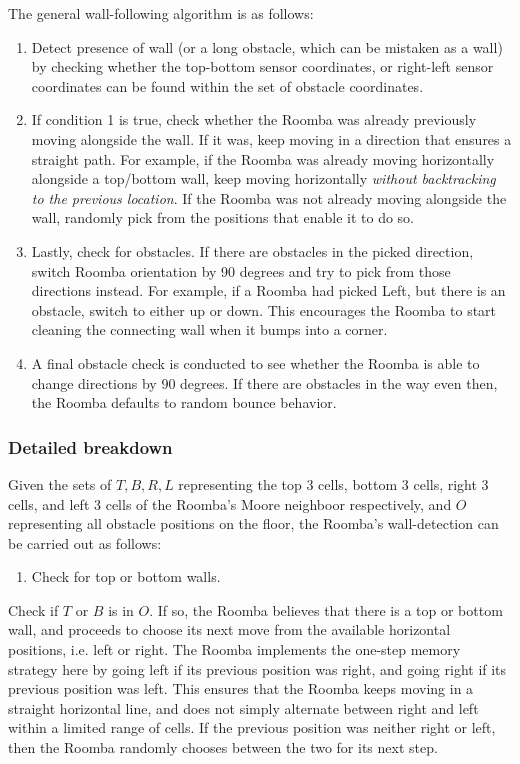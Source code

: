 \documentclass[11pt]{article}
\providecommand{\tightlist}{%
      \setlength{\itemsep}{0pt}\setlength{\parskip}{0pt}}
\begin{document}
The general wall-following algorithm is as follows:

\begin{enumerate}
\def\labelenumi{\arabic{enumi})}
\item
  Detect presence of wall (or a long obstacle, which can be mistaken as
  a wall) by checking whether the top-bottom sensor coordinates, or
  right-left sensor coordinates can be found within the set of obstacle
  coordinates.
\item
  If condition 1 is true, check whether the Roomba was already
  previously moving alongside the wall. If it was, keep moving in a
  direction that ensures a straight path. For example, if the Roomba was
  already moving horizontally alongside a top/bottom wall, keep moving
  horizontally \emph{without backtracking to the previous location}. If
  the Roomba was not already moving alongside the wall, randomly pick
  from the positions that enable it to do so.
\item
  Lastly, check for obstacles. If there are obstacles in the picked
  direction, switch Roomba orientation by 90 degrees and try to pick
  from those directions instead. For example, if a Roomba had picked
  Left, but there is an obstacle, switch to either up or down. This
  encourages the Roomba to start cleaning the connecting wall when it
  bumps into a corner.
\item
  A final obstacle check is conducted to see whether the Roomba is able
  to change directions by 90 degrees. If there are obstacles in the way
  even then, the Roomba defaults to random bounce behavior.
\end{enumerate}

\subsubsection{Detailed breakdown}

Given the sets of \(T, B, R, L\) representing the top 3 cells, bottom 3
cells, right 3 cells, and left 3 cells of the Roomba's Moore neighboor
respectively, and \(O\) representing all obstacle positions on the
floor, the Roomba's wall-detection can be carried out as follows:

\begin{enumerate}
\def\labelenumi{\arabic{enumi})}
\tightlist
\item
  Check for top or bottom walls.
\end{enumerate}

Check if \(T\) or \(B\) is in \(O\). If so, the Roomba believes that
there is a top or bottom wall, and proceeds to choose its next move from
the available horizontal positions, i.e. left or right. The Roomba
implements the one-step memory strategy here by going left if its
previous position was right, and going right if its previous position
was left. This ensures that the Roomba keeps moving in a straight
horizontal line, and does not simply alternate between right and left
within a limited range of cells. If the previous position was neither
right or left, then the Roomba randomly chooses between the two for its
next step.\\
\end{document}
